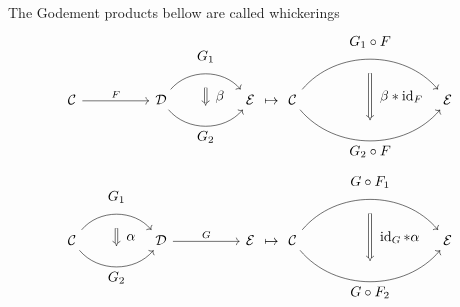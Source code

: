 \begin{defi}
    The Godement products bellow are called whickerings
    \[
    \begin{tikzcd}[column sep = huge]
    	\mathcal{C}
    		\ar[r, " F "]
    	&
    	\mathcal{D}
    		\arrow[bend left=50]{r}[name=U',label=above:$G_1$]{}
    		\arrow[bend right=50]{r}[name=D',label=below:$G_2$]{}
    	&
    	\mathcal{E} 
    		\arrow[shorten <=10pt,shorten >=10pt,Rightarrow,to path={(U') -- node[label=right:$\beta$] {} (D')}]{} 
    \end{tikzcd}
	\mapsto
	\begin{tikzcd}[column sep = huge]
		\mathcal{ C }
			\arrow[bend left=50]{rr}[name=U',label=above:$G_1 \circ F$]{}
			\arrow[bend right=50]{rr}[name=D',label=below:$G_2 \circ F $]{}
		&&
		\mathcal{ E }
			\arrow[shorten <=10pt,shorten >=10pt,Rightarrow,to path={(U') -- node[label=right:$\beta*\id_F$] {} (D')}]{} 
	\end{tikzcd}
	\]
	\[
	\begin{tikzcd}[column sep = huge]
		\mathcal{C}
		\arrow[bend left=50]{r}[name=U',label=above:$G_1$]{}
		\arrow[bend right=50]{r}[name=D',label=below:$G_2$]{}
		&
		\mathcal{D} 
		\arrow[shorten <=10pt,shorten >=10pt,Rightarrow,to path={(U') -- node[label=right:$\alpha$] {} (D')}]{} 
		\ar[r, " G"]
		&
		\mathcal{ E }
	\end{tikzcd}
	\mapsto
	\begin{tikzcd}[column sep = huge]
		\mathcal{ C }
		\arrow[bend left=50]{rr}[name=U',label=above:$G \circ F_1$]{}
		\arrow[bend right=50]{rr}[name=D',label=below:$G \circ F_2 $]{}
		&&
		\mathcal{ E }
		\arrow[shorten <=10pt,shorten >=10pt,Rightarrow,to path={(U') -- node[label=right:$\id_G*\alpha$] {} (D')}]{} 
	\end{tikzcd}
	\]
	
\end{defi}

